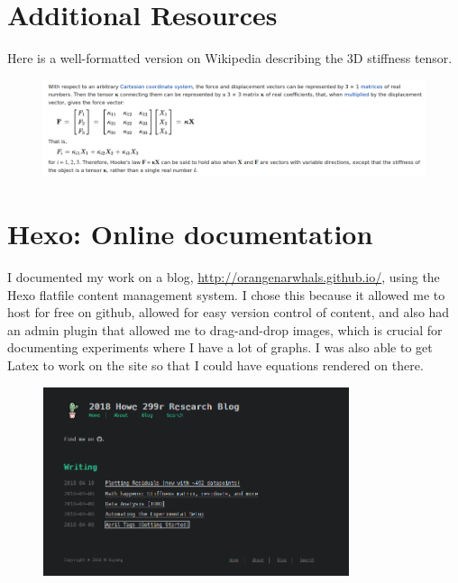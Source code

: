 \documentclass[preprint,12pt,3p]{elsarticle}
\begin{document}
\section{Additional Resources}

Here is a well-formatted version on Wikipedia describing the 3D stiffness tensor. 

\begin{figure}[H]
\centering
\includegraphics[width=\textwidth]{images/misc/stiffness_tensor.png}
\end{figure}



\newpage

\section{Hexo: Online documentation}

I documented my work on a blog, \url{http://orangenarwhals.github.io/}, using the Hexo flatfile content
management system. I chose this because it allowed me to host for free on github, allowed for easy
version control of content, and also had an admin plugin that allowed me to drag-and-drop images,
which is crucial for documenting experiments where I have a lot of graphs. I was also able to get
Latex to work on the site so that I could have equations rendered on there.

\begin{figure}[H]
\centering
\includegraphics[width=0.8\textwidth]{images/misc/blog.png}
\end{figure}
\end{document}
